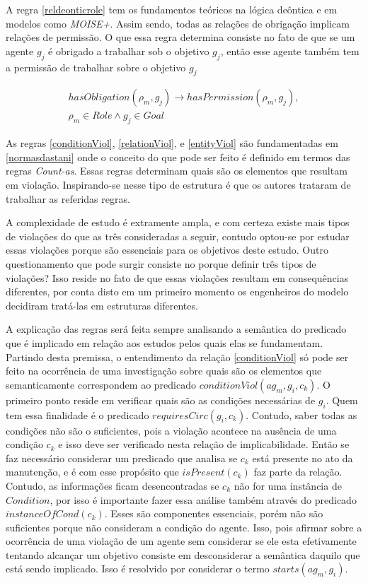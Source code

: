 A regra \ref{reldeonticrole} tem os fundamentos teóricos na lógica deôntica e em modelos como \textit{MOISE+}. Assim sendo, todas as relações de obrigação implicam relações de permissão. O que essa regra determina consiste no fato de que se um agente $g_j$ é obrigado a trabalhar sob o objetivo $g_j$, então esse agente também tem a permissão de trabalhar sobre o objetivo $g_j$ 

\begin{eqnarray}\label{reldeonticrole}
	hasObligation(\rho_m,g_j) \to hasPermission(\rho_m,g_j), \nonumber \\
    \rho_m \in Role \wedge g_j \in Goal
\end{eqnarray}

As regras \ref{conditionViol}, \ref{relationViol}, e \ref{entityViol} são fundamentadas em \ref{normasdastani} onde o conceito do que pode ser feito é definido em termos das regras \textit{Count-as}. Essas regras determinam quais são os elementos que resultam em violação. Inspirando-se nesse tipo de estrutura é que os autores trataram de trabalhar as referidas regras. 

A complexidade de estudo é extramente ampla, e com certeza existe mais tipos de violações do que as três consideradas a seguir, contudo optou-se por estudar essas violações porque são essenciais para os objetivos deste estudo. Outro questionamento que pode surgir consiste no porque definir três tipos de violações? Isso reside no fato de que essas violações resultam em consequências diferentes, por conta disto em um primeiro momento os engenheiros do modelo decidiram tratá-las em estruturas diferentes. 

A explicação das regras será feita sempre analisando a semântica do predicado que é implicado em relação aos estudos pelos quais elas se fundamentam. Partindo desta premissa, o entendimento da relação \ref{conditionViol} só pode ser feito na ocorrência de uma  investigação sobre quais são os elementos que semanticamente correspondem ao predicado $conditionViol(ag_m,g_i,c_k)$. O primeiro ponto reside em verificar quais são as condições necessárias de $g_i$. Quem tem essa finalidade é o predicado $requiresCirc(g_i,c_k)$. Contudo, saber todas as condições não são o suficientes, pois a violação acontece na ausência de uma condição $c_k$ e isso deve ser verificado nesta relação de implicabilidade. Então se faz necessário considerar um predicado que analisa se $c_k$ está presente no ato da manutenção, e é com esse propósito que $isPresent(c_k)$ faz parte da relação. Contudo, as informações ficam desencontradas se $c_k$ não for uma instância de $Condition$, por isso é importante fazer essa análise também através do predicado $instanceOfCond(c_k)$. Esses são componentes essenciais, porém não são suficientes porque não consideram a condição do agente. Isso, pois afirmar sobre a ocorrência de uma violação de um agente sem considerar se ele esta efetivamente tentando alcançar um objetivo consiste em desconsiderar a semântica daquilo que está sendo implicado. Isso é resolvido por considerar o termo  $starts(ag_m,g_i)$. 


